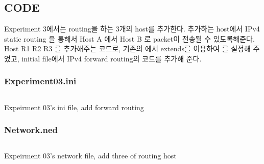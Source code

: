 \vspace{-3mm}
\section{}
\vspace{-4mm}
\subsection*{CODE}
\vspace{-3mm}
Experiment 3에서는 routing을 하는 3개의 host를 추가한다.  추가하는 host에서 IPv4 static routing 을 통해서 Host A 에서 Host B 로 packet이 전송될 수 있도록해준다. Host R1 R2 R3 를 추가해주는 코드로, 기존의  에서 extends를 이용하여   를 설정해 주었고, initial  file에서 IPv4 forward routing의 코드를 추가해 준다.
    \vspace{-3mm}
\subsubsection*{Experiment03.ini}
    \vspace{-2mm}
    \begin{listing}[h!]
    \inputminted[framerule = 1pt,framesep = 2mm , frame = lines, fontsize=\footnotesize ]{c}{./code/week12/Experiment_03/ini.cpp}
    \vspace{-3mm}
    \caption{\footnotesize Expeirment 03's ini file, add forward routing}
    \end{listing}
    \vspace{-6mm}
\subsubsection*{Network.ned}
    \vspace{-2mm}
    \begin{listing}[h!]
    \inputminted[framerule = 1pt,framesep = 2mm , frame = lines, fontsize=\footnotesize ]{c}{./code/week12/Experiment_03/Network03.cpp}
    \vspace{-3mm}
    \caption{\footnotesize Expeirment 03's network file, add three of routing host}
    \end{listing}
    \vspace{-6mm} 
    
